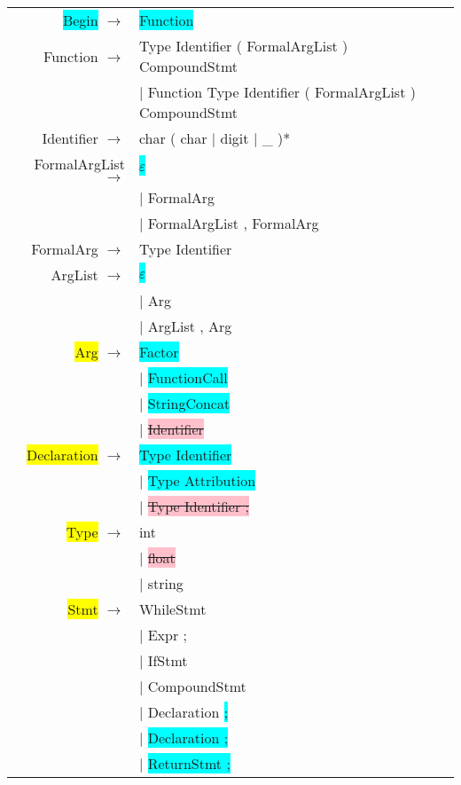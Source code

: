 \documentclass[12pt]{article}
\begin{document}
\begin{longtable}{ r l }
	\colorbox{cyan}{Begin} 			$\rightarrow$ 	& \colorbox{cyan}{Function} \\
	Function 		$\rightarrow$ 	& Type Identifier ( FormalArgList ) CompoundStmt \\
									& $|$ Function Type Identifier ( FormalArgList ) CompoundStmt \\
	Identifier		$\rightarrow$   & char ( char $|$ digit $|$ \_ )* \\
	FormalArgList 	$\rightarrow$ 	& \colorbox{cyan}{$\varepsilon$} \\
									& $|$ FormalArg \\
									& $|$ FormalArgList , FormalArg \\
	FormalArg 		$\rightarrow$ 	& Type Identifier \\
	ArgList			$\rightarrow$ 	& \colorbox{cyan}{$\varepsilon$} \\
									& $|$ Arg \\
									& $|$ ArgList , Arg \\
	\colorbox{yellow}{Arg}				$\rightarrow$ 	& \colorbox{cyan}{Factor} \\
									& $|$ \colorbox{cyan}{FunctionCall} \\
									& $|$ \colorbox{cyan}{StringConcat} \\
									& $|$ \colorbox{pink}{\sout{Identifier}} \\
	\colorbox{yellow}{Declaration}		$\rightarrow$ 	& \colorbox{cyan}{Type Identifier} \\
									& $|$ \colorbox{cyan}{Type Attribution} \\
									& $|$ \colorbox{pink}{\sout{Type Identifier ;}} \\
	\colorbox{yellow}{Type}			$\rightarrow$ 	& int \\
									& $|$ \colorbox{pink}{\sout{float}} \\
									& $|$ string \\
	\colorbox{yellow}{Stmt} 			$\rightarrow$ 	& WhileStmt \\
									& $|$ Expr ; \\
									& $|$ IfStmt \\
									& $|$ CompoundStmt \\
									& $|$ Declaration \colorbox{cyan}{;}\\
									& $|$ \colorbox{cyan}{Declaration ;} \\
									& $|$ \colorbox{cyan}{ReturnStmt ;} \\

\end{longtable}
\end{document}
